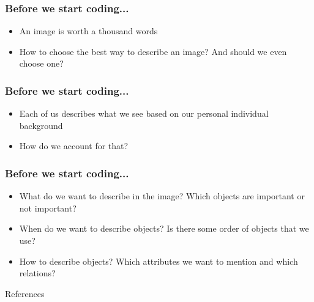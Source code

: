\documentclass[aspectratio=1610]{beamer} %
\begin{document}
\begin{frame}
\frametitle{Before we start coding...}
\begin{itemize}
	\item An image is worth a thousand words
	\item How to choose the best way to describe an image? And should we even choose one?
\end{itemize}
\end{frame}

\begin{frame}
\frametitle{Before we start coding...}
\begin{itemize}
	\item Each of us describes what we see based on our personal individual background
	\item How do we account for that?
\end{itemize}
\end{frame}

\begin{frame}
\frametitle{Before we start coding...}
\begin{itemize}
	\item What do we want to describe in the image? Which objects are important or not important?
	\pause
	\item When do we want to describe objects? Is there some order of objects that we use?
	\pause
	\item How to describe objects? Which attributes we want to mention and which relations?
\end{itemize}
\end{frame}







\begin{frame}[allowframebreaks]{References}

\small






\end{frame}
\end{document}

